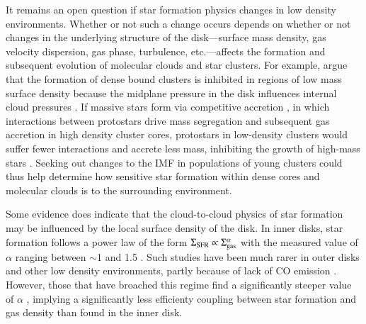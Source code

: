 \documentclass[iop]{emulateapj}
\begin{document}
It remains an open question if star formation physics changes in low
density environments.  Whether or not such a change occurs depends on
whether or not changes in the underlying structure of the
disk---surface mass density, gas velocity dispersion, gas phase,
turbulence, etc.---affects the formation and subsequent evolution of
molecular clouds and star clusters.  For example, \citep{meurer09}
argue that the formation of dense bound clusters is inhibited in
regions of low mass surface density because the midplane pressure in
the disk influences internal cloud pressures \citep[see
  e.g.][]{dopita03}.  If massive stars form via competitive accretion
\citep{larson73}, in which interactions between protostars drive mass
segregation and subsequent gas accretion in high density cluster
cores, protostars in low-density clusters would suffer fewer
interactions and accrete less mass, inhibiting the growth of high-mass
stars \citep[e.g.][]{bonnell04}.  Seeking out changes to the IMF in
populations of young clusters could thus help determine how sensitive
star formation within dense cores and molecular clouds is to the
surrounding environment.

Some evidence does indicate that the cloud-to-cloud physics of star
formation may be influenced by the local surface density of the disk.
In inner disks, star formation follows a power law of the form
$\Sigma_{\rm SFR} \propto \Sigma_{\rm gas}^{\alpha}$ with the measured
value of $\alpha$ ranging between $\sim$1 and 1.5 \citep[as originally
  proposed by Schmidt 1959, and subsequently confirmed
  observationally, e.g.][]{kennicutt89, kennicutt98, kennicutt07,
  bigiel08}.  Such studies have been much rarer in outer disks and
other low density environments, partly because of lack of CO emission
\citep[likely due to low metallicity or changes in ISM
  pressure;][]{elmegreen15}.  However, those that have broached this
regime find a significantly steeper value of $\alpha$
\citep[$\sim$2--3;][]{bigiel08, bigiel10, bolatto11, schruba11},
implying a significantly less efficienty coupling between star
formation and gas density than found in the inner disk.
\end{document}
